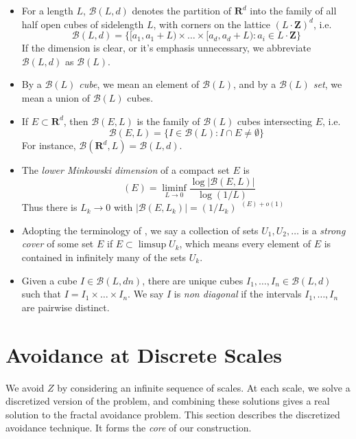 \documentclass{article}
\theoremstyle{plain}
\theoremstyle{plain}
\DeclareMathOperator{\lhdim}{\underline{\dim}_{\mathbf{M}}}
\begin{document}
\begin{itemize}
	\item For a length $L$, $\mathcal{B}(L,d)$ denotes the partition of $\mathbf{R}^d$ into the family of all half open cubes of sidelength $L$, with corners on the lattice $(L \cdot \mathbf{Z})^d$, i.e.
	\[ \mathcal{B}(L,d) = \{ [a_1,a_1 + L) \times \dots \times [a_d, a_d + L) : a_i \in L \cdot \mathbf{Z} \} \]
	If the dimension is clear, or it's emphasis unnecessary, we abbreviate $\mathcal{B}(L,d)$ as $\mathcal{B}(L)$.

	\item By a {\it $\mathcal{B}(L)$ cube}, we mean an element of $\mathcal{B}(L)$, and by a {\it $\mathcal{B}(L)$ set}, we mean a union of $\mathcal{B}(L)$ cubes.

	\item If $E \subset \mathbf{R}^d$, then $\mathcal{B}(E,L)$ is the family of $\mathcal{B}(L)$ cubes intersecting $E$, i.e.
	\[\mathcal{B}(E,L) = \{ I \in \mathcal{B}(L): I \cap E \neq \emptyset \} \]
	For instance, $\mathcal{B}(\mathbf{R}^d,L) = \mathcal{B}(L,d)$.

	\item The {\it lower Minkowski dimension} of a compact set $E$ is
	\[ \lhdim(E) = \liminf_{L \to 0} \frac{\log |\mathcal{B}(E,L)|}{\log(1/L)} \]
	Thus there is $L_k \to 0$ with $|\mathcal{B}(E,L_k)| = (1/L_k)^{\lhdim(E) + o(1)}$

	\item Adopting the terminology of \cite{KatzTao}, we say a collection of sets $U_1, U_2, \dots$ is a {\it strong cover} of some set $E$ if $E \subset \limsup U_k$, which means every element of $E$ is contained in infinitely many of the sets $U_k$.

	\item Given a cube $I \in \mathcal{B}(L, dn)$, there are unique cubes $I_1, \dots, I_n \in \mathcal{B}(L,d)$ such that $I = I_1 \times \dots \times I_n$. We say $I$ is {\it non diagonal} if the intervals $I_1, \dots, I_n$ are pairwise distinct.
\end{itemize}

\section{Avoidance at Discrete Scales}

We avoid $Z$ by considering an infinite sequence of scales. At each scale, we solve a discretized version of the problem, and combining these solutions gives a real solution to the fractal avoidance problem. This section describes the discretized avoidance technique. It forms the {\it core} of our construction.
\end{document}
